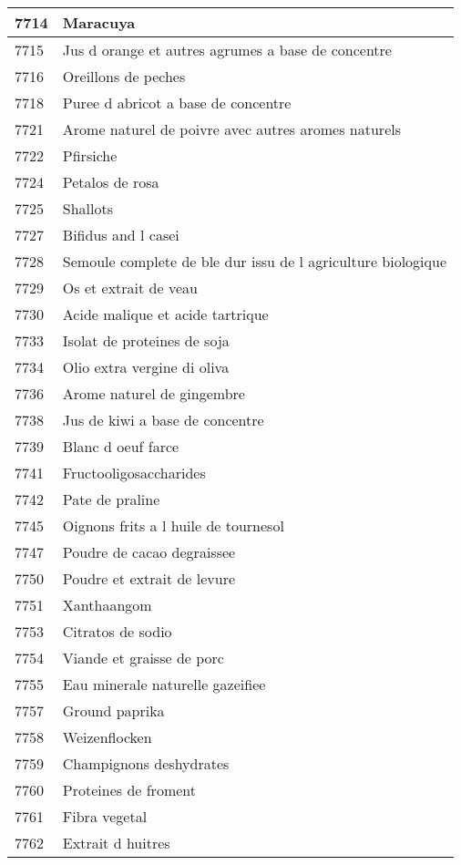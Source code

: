 \begin{longtable}{|l|l|}
7714 & Maracuya \\ \hline 
7715 & Jus d orange et autres agrumes a base de concentre \\ \hline 
7716 & Oreillons de peches \\ \hline 
7718 & Puree d abricot a base de concentre \\ \hline 
7721 & Arome naturel de poivre avec autres aromes naturels \\ \hline 
7722 & Pfirsiche \\ \hline 
7724 & Petalos de rosa \\ \hline 
7725 & Shallots \\ \hline 
7727 & Bifidus and l casei \\ \hline 
7728 & Semoule complete de ble dur issu de l agriculture biologique \\ \hline 
7729 & Os et extrait de veau \\ \hline 
7730 & Acide malique et acide tartrique \\ \hline 
7733 & Isolat de proteines de soja \\ \hline 
7734 & Olio extra vergine di oliva \\ \hline 
7736 & Arome naturel de gingembre \\ \hline 
7738 & Jus de kiwi a base de concentre \\ \hline 
7739 & Blanc d oeuf farce \\ \hline 
7741 & Fructooligosaccharides \\ \hline 
7742 & Pate de praline \\ \hline 
7745 & Oignons frits a l huile de tournesol \\ \hline 
7747 & Poudre de cacao degraissee \\ \hline 
7750 & Poudre et extrait de levure \\ \hline 
7751 & Xanthaangom \\ \hline 
7753 & Citratos de sodio \\ \hline 
7754 & Viande et graisse de porc \\ \hline 
7755 & Eau minerale naturelle gazeifiee \\ \hline 
7757 & Ground paprika \\ \hline 
7758 & Weizenflocken \\ \hline 
7759 & Champignons deshydrates \\ \hline 
7760 & Proteines de froment \\ \hline 
7761 & Fibra vegetal \\ \hline 
7762 & Extrait d huitres \\ \hline 

\end{longtable}

